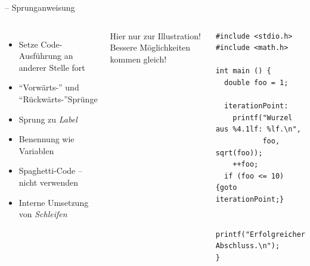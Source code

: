 \begin{frame}[fragile]{ -- Sprunganweisung}
%
\begin{columns}[T]
\begin{itemize}
\item Setze Code-Ausführung an anderer Stelle fort
\item \enquote{Vorwärts-} und \enquote{Rückwärts-}Sprünge
\item Sprung zu \emph{Label}
\item Benennung wie Variablen
\item Spaghetti-Code -- nicht verwenden
\item Interne Umsetzung von \emph{Schleifen}
\end{itemize}
\begin{warnbox}
Hier nur zur Illustration! Bessere Möglichkeiten kommen gleich!
\end{warnbox}
%
\vspace{-6pt}
\begin{codebox}
\begin{verbatim}
#include <stdio.h>
#include <math.h>

int main () {
  double foo = 1;

  iterationPoint:
    printf("Wurzel aus %4.1lf: %lf.\n",
           foo, sqrt(foo));
    ++foo;
  if (foo <= 10) {goto iterationPoint;}
    
  printf("Erfolgreicher Abschluss.\n");
}
\end{verbatim}
\end{codebox}
\end{columns}
%
\end{frame}


